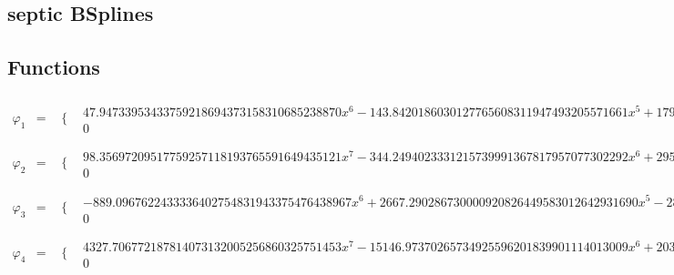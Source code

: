 \documentclass{article}
\begin{document}
 

\begin{landscape}
\section{septic BSplines}
\subsection{Functions}\begin{eqnarray*} \varphi_1 & = & \begin{array}{cc}
 \{ & 
\begin{array}{cc}
 47.94733953433759218694373158310685238870 x^6-143.8420186030127765608311947493205571661 x^5+179.8025232537659707010389934366506964576 x^4-119.8683488358439804673593289577671309717 x^3+35.96050465075319414020779868733013929152 x^2 & x\geq 0\land x<1 \\
 0 & \text{True}
\end{array}

\end{array}\\
\varphi_2 & = & \begin{array}{cc}
 \{ & 
\begin{array}{cc}
 98.35697209517759257118193765591649435121 x^7-344.2494023331215739991367817957077302292 x^6+295.0709162855327777135458129677494830536 x^5+122.9462151189719907139774220698956179390 x^4-245.8924302379439814279548441397912358780 x^3+73.76772907138319442838645324193737076341 x^2 & x\geq 0\land x<1 \\
 0 & \text{True}
\end{array}

\end{array}\\
\varphi_3 & = & \begin{array}{cc}
 \{ & 
\begin{array}{cc}
 -889.0967622433336402754831943375476438967 x^6+2667.290286730000920826449583012642931690 x^5-2868.006110982258515203021876048711379727 x^4+1290.528410747848829028627780409684539970 x^3-200.7158242522575943765722930360684480369 x^2 & x\geq 0\land x<1 \\
 0 & \text{True}
\end{array}

\end{array}\\
\varphi_4 & = & \begin{array}{cc}
 \{ & 
\begin{array}{cc}
 4327.706772187814073132005256860325751453 x^7-15146.97370265734925596201839901114013009 x^6+20310.71473765417286594907012594675608353 x^5-12909.35258749205902496762931733903988360 x^4+3835.921911711926110276095568580743279697 x^3-418.0171314045047684275232350376451009927 x^2 & x\geq 0\land x<1 \\
 0 & \text{True}
\end{array}


\end{array}
\end{eqnarray*}
\end{landscape}
\end{document}
